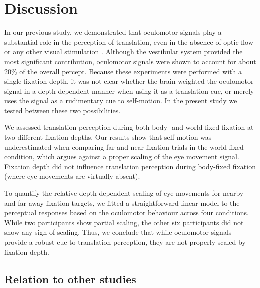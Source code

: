 

\section{Discussion}

In our previous study, we demonstrated that oculomotor signals play a substantial role in the perception of translation, even in the absence of optic flow or any other visual stimulation \cite{clemens2015a}. Although the vestibular system provided the most significant contribution, oculomotor signals were shown to account for about 20\% of the overall percept. Because these experiments were performed with a single fixation depth, it was not clear whether the brain weighted the oculomotor signal in a depth-dependent manner when using it as a translation cue, or merely uses the signal as a rudimentary cue to self-motion. In the present study we tested between these two possibilities.

We assessed translation perception during both body- and world-fixed fixation at two different fixation depths. Our results show that self-motion was underestimated when comparing far and near fixation trials in the world-fixed condition, which argues against a proper scaling of the eye movement signal. Fixation depth did not influence translation perception during body-fixed fixation (where eye movements are virtually absent).

To quantify the relative depth-dependent scaling of eye movements for nearby and far away fixation targets, we fitted a straightforward linear model to the perceptual responses based on the oculomotor behaviour across four conditions. While two participants show partial scaling, the other six participants did not show any sign of scaling. Thus, we conclude that while oculomotor signals provide a robust cue to translation perception, they are not properly scaled by fixation depth.


\subsection{Relation to other studies}

